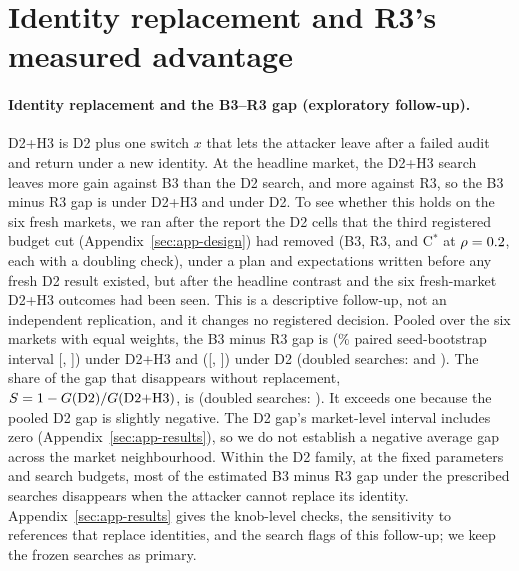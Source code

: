 \documentclass[11pt]{article}
\begin{document}

\section{Identity replacement and R3's measured advantage}\label{sec:reset}
\paragraph{Identity replacement and the B3--R3 gap (exploratory follow-up).} D2+H3 is D2 plus one switch $x$ that lets the attacker leave after a failed audit and return under a new identity. At the headline market, the D2+H3 search leaves  more gain against B3 than the D2 search, and  more against R3, so the B3 minus R3 gap is  under D2+H3 and  under D2. To see whether this holds on the six fresh markets, we ran after the report the D2 cells that the third registered budget cut (Appendix~\ref{sec:app-design}) had removed (B3, R3, and C$^*$ at $\rho=0.2$, each with a doubling check), under a plan and expectations written before any fresh D2 result existed, but after the headline contrast and the six fresh-market D2+H3 outcomes had been seen. This is a descriptive follow-up, not an independent replication, and it changes no registered decision. Pooled over the six markets with equal weights, the B3 minus R3 gap is  (\% paired seed-bootstrap interval [, ]) under D2+H3 and  ([, ]) under D2 (doubled searches:  and ). The share of the gap that disappears without replacement, $S = 1 - G(\mathrm{D2})/G(\mathrm{D2{+}H3})$, is  (doubled searches: ). It exceeds one because the pooled D2 gap is slightly negative. The D2 gap's market-level interval includes zero (Appendix~\ref{sec:app-results}), so we do not establish a negative average gap across the market neighbourhood. Within the D2 family, at the fixed parameters and search budgets, most of the estimated B3 minus R3 gap under the prescribed searches disappears when the attacker cannot replace its identity. Appendix~\ref{sec:app-results} gives the knob-level checks, the sensitivity to references that replace identities, and the search flags of this follow-up; we keep the frozen searches as primary.
\begin{table}[t]\centering\small
{}
\caption{Exploratory follow-up, after the report: the difference between the two prescribed searches, $I = g(\mathrm{D2{+}H3}) - g(\mathrm{D2})$, per rule, its contrasts, the B3 minus R3 gaps $G$ under each family, and the share $S$, pooled over the six fresh markets with equal weights, with paired seed-bootstrap percentile intervals; frozen and doubled searches. $S$ is shown only when the lower bound of the pooled D2+H3 gap exceeds the preset floor. The lower block gives the gaps per market (D2+H3 / D2).}\label{tab:ph-reset}
\end{table}
\end{document}
